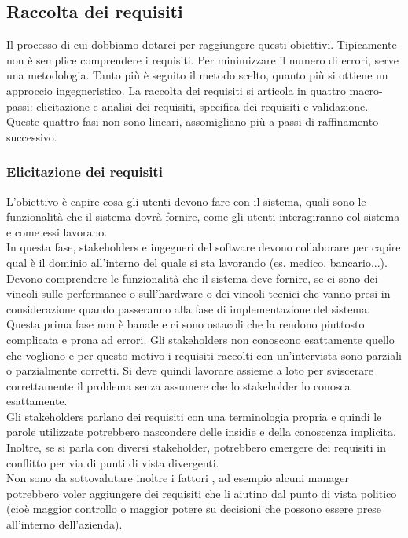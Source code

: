 \subsection{Raccolta dei requisiti}
Il processo di cui dobbiamo dotarci per raggiungere questi obiettivi.
Tipicamente non è semplice comprendere i requisiti.
Per minimizzare il numero di errori, serve una metodologia.
Tanto più è seguito il metodo scelto, quanto più si ottiene un approccio ingegneristico.
La raccolta dei requisiti si articola in quattro macro-passi: elicitazione e analisi dei requisiti, specifica dei requisiti e validazione. Queste quattro fasi non sono lineari, assomigliano più a passi di raffinamento successivo.

\subsubsection{Elicitazione dei requisiti}
L'obiettivo è capire cosa gli utenti devono fare con il sistema, quali sono le funzionalità che il sistema dovrà fornire, come gli utenti interagiranno col sistema e come essi lavorano.\\
In questa fase, stakeholders e ingegneri del software devono collaborare per capire qual è il dominio all'interno del quale si sta lavorando (es. medico, bancario...).
Devono comprendere le funzionalità che il sistema deve fornire, se ci sono dei vincoli sulle performance o sull'hardware o dei vincoli tecnici che vanno presi in considerazione quando passeranno alla fase di implementazione del sistema.\\
Questa prima fase non è banale e ci sono ostacoli che la rendono piuttosto complicata e prona ad errori.
Gli stakeholders non conoscono esattamente quello che vogliono e per questo motivo i requisiti raccolti con un'intervista sono parziali o parzialmente corretti.
Si deve quindi lavorare assieme a loto per sviscerare correttamente il problema senza assumere che lo stakeholder lo conosca esattamente.\\
Gli stakeholders parlano dei requisiti con una terminologia propria e quindi le parole utilizzate potrebbero nascondere delle insidie e della conoscenza implicita.
Inoltre, se si parla con diversi stakeholder, potrebbero emergere dei requisiti in conflitto per via di punti di vista divergenti.\\
Non sono da sottovalutare inoltre i fattori , ad esempio alcuni manager potrebbero voler aggiungere dei requisiti che li aiutino dal punto di vista politico (cioè maggior controllo o maggior potere su decisioni che possono essere prese all'interno dell'azienda).\\
